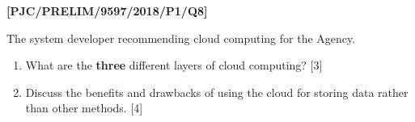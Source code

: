 \item \textbf{{[}PJC/PRELIM/9597/2018/P1/Q8{]} }

The system developer recommending cloud computing for the Agency. 
\begin{enumerate}
\item What are the \textbf{three} different layers of cloud computing? \hfill{}{[}3{]}
\item Discuss the benefits and drawbacks of using the cloud for storing
data rather than other methods. \hfill{} {[}4{]}
\end{enumerate}